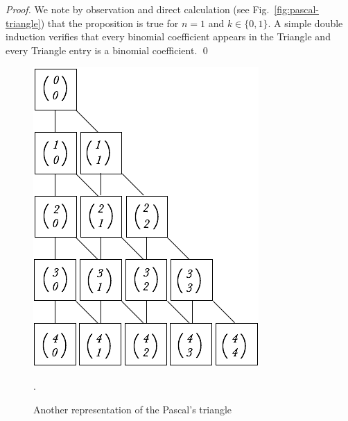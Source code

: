 \begin{proof}
We note by observation and direct calculation (see
Fig.~\ref{fig:pascal-triangle}) that the proposition is true for $n =
1$ and $k \in \{0, 1\}$.  A simple double induction verifies that
every binomial coefficient appears in the Triangle and every Triangle
entry is a binomial coefficient.  \qed
\end{proof}


\begin{figure}[htb]
\begin{center}
       \includegraphics[scale=0.4]{FiguresMaths/CoeffBinomiaux1}
\caption{Another representation of the Pascal's triangle}.
\label{fig:binomialCoeff1}
\end{center}
\end{figure}

